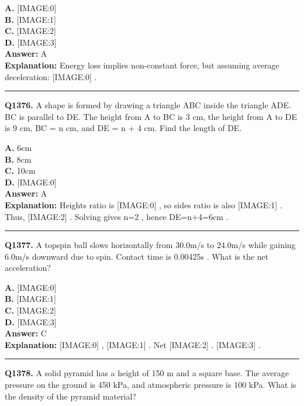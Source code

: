 \documentclass[12pt]{article}
\begin{document}
\textbf{A.} [IMAGE:0] \\
\textbf{B.} [IMAGE:1] \\
\textbf{C.} [IMAGE:2] \\
\textbf{D.} [IMAGE:3] \\

\textbf{Answer:} A \\
\textbf{Explanation:} Energy loss implies non-constant force, but assuming average deceleration:
[IMAGE:0]
.

\hrule
\vspace{1em}


\noindent
\textbf{Q1376.} A shape is formed by drawing a triangle ABC inside the triangle ADE. BC is parallel to DE. The height from A to BC is 3 cm, the height from A to DE is 9 cm, BC = n cm, and DE = n + 4 cm.
Find the length of DE.



\textbf{A.} 6cm \\
\textbf{B.} 8cm \\
\textbf{C.} 10cm \\
\textbf{D.} [IMAGE:0] \\

\textbf{Answer:} A \\
\textbf{Explanation:} Heights ratio is
[IMAGE:0]
, so sides ratio is also
[IMAGE:1]
. Thus,
[IMAGE:2]
. Solving gives n=2
, hence DE=n+4=6cm
.

\hrule
\vspace{1em}


\noindent
\textbf{Q1377.} A topspin ball slows horizontally from 30.0m/s
to 24.0m/s
while gaining 6.0m/s
downward due to spin. Contact time is 0.00425s
.
What is the net acceleration?



\textbf{A.} [IMAGE:0] \\
\textbf{B.} [IMAGE:1] \\
\textbf{C.} [IMAGE:2] \\
\textbf{D.} [IMAGE:3] \\

\textbf{Answer:} C \\
\textbf{Explanation:} [IMAGE:0]
,
[IMAGE:1]
. Net
[IMAGE:2]
.
[IMAGE:3]
.

\hrule
\vspace{1em}


\noindent
\textbf{Q1378.} A solid pyramid has a height of 150 m and a square base. The average pressure on the ground is 450 kPa, and atmospheric pressure is 100 kPa. What is the density of the pyramid material?
\end{document}
